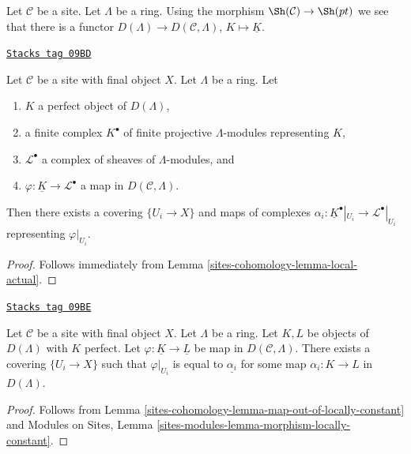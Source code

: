 Let $\mathcal{C}$ be a site. Let $\Lambda$ be a ring. Using the
morphism $\Sh(\mathcal{C}) \to \Sh(pt)$ we see that there is a
functor $D(\Lambda) \to D(\mathcal{C}, \Lambda)$, $K \mapsto \underline{K}$.

\begin{lemma}
\label{sites-cohomology-lemma-map-out-of-locally-constant}
\href{https://stacks.math.columbia.edu/tag/09BD}{\texttt{Stacks tag 09BD}}

Let $\mathcal{C}$ be a site with final object $X$. Let $\Lambda$ be a ring. Let
\begin{enumerate}
\item $K$ a perfect object of $D(\Lambda)$,
\item a finite complex $K^\bullet$ of finite projective $\Lambda$-modules
representing $K$,
\item $\mathcal{L}^\bullet$ a complex of sheaves of $\Lambda$-modules, and
\item $\varphi : \underline{K} \to \mathcal{L}^\bullet$ a map in
$D(\mathcal{C}, \Lambda)$.
\end{enumerate}
Then there exists a covering $\{U_i \to X\}$ and maps of complexes
$\alpha_i : \underline{K}^\bullet|_{U_i} \to \mathcal{L}^\bullet|_{U_i}$
representing $\varphi|_{U_i}$.
\end{lemma}

\begin{proof}
Follows immediately from Lemma \ref{sites-cohomology-lemma-local-actual}.
\end{proof}

\begin{lemma}
\label{sites-cohomology-lemma-locally-constant-map}
\href{https://stacks.math.columbia.edu/tag/09BE}{\texttt{Stacks tag 09BE}}

Let $\mathcal{C}$ be a site with final object $X$.
Let $\Lambda$ be a ring. Let $K, L$ be objects of
$D(\Lambda)$ with $K$ perfect. Let $\varphi : \underline{K} \to \underline{L}$
be map in $D(\mathcal{C}, \Lambda)$. There exists a covering $\{U_i \to X\}$
such that $\varphi|_{U_i}$ is equal to $\underline{\alpha_i}$
for some map $\alpha_i : K \to L$ in $D(\Lambda)$.
\end{lemma}

\begin{proof}
Follows from Lemma \ref{sites-cohomology-lemma-map-out-of-locally-constant} and
Modules on Sites, Lemma \ref{sites-modules-lemma-morphism-locally-constant}.
\end{proof}


